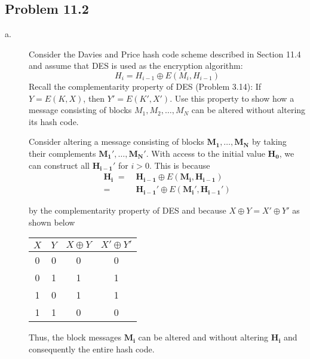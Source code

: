 \documentclass[../hw_sols.tex]{subfiles}
\begin{document}

\subsection*{Problem 11.2}

\begin{description}

\item[a.] Consider the Davies and Price hash code scheme described in 
Section 11.4 and assume that DES is used as the encryption algorithm:
	\[ H_i = H_{i-1} \oplus E(M_i, H_{i-1}) \]
Recall the complementarity property of DES (Problem 3.14): If $Y = E(K, X)$, 
then $Y' = E(K', X')$. Use this property to show how a message consisting of 
blocks $M_1, M_2, \dots, M_N$ can be altered without altering its hash code.

\begin{solution}

Consider altering a message consisting of blocks 
$\mathbf{M_1}, \dots, \mathbf{M_N}$ by taking their complements 
$\mathbf{M_1}', \dots, \mathbf{M_N}'$. With access to the initial value 
$\mathbf{H_0}$, we can construct all $\mathbf{H_{i-1}}'$ for $i>0$. This is 
because
\begin{align*}
	\mathbf{H_i} \; 
	=& \; \mathbf{H_{i-1}} \oplus E(\mathbf{M_i}, \mathbf{H_{i-1}}) \\
	=& \; \mathbf{H_{i-1}}' \oplus E(\mathbf{M_i}', \mathbf{H_{i-1}}')
\end{align*}

by the complementarity property of DES and because 
$X \oplus Y = X' \oplus Y'$ as shown below
\begin{center}
\begin{tabular}{c c c c}
	$X$ & $Y$ & $X \oplus Y$ & $X' \oplus Y'$ \\
	\hline
	0 & 0 & 0 & 0 \\
	0 & 1 & 1 & 1 \\
	1 & 0 & 1 & 1 \\
	1 & 1 & 0 & 0 \\
\end{tabular}
\end{center}

Thus, the block messages $\mathbf{M_i}$ can be altered and without altering 
$\mathbf{H_i}$ and consequently the entire hash code.


\end{solution}
\end{description}
\end{document}
